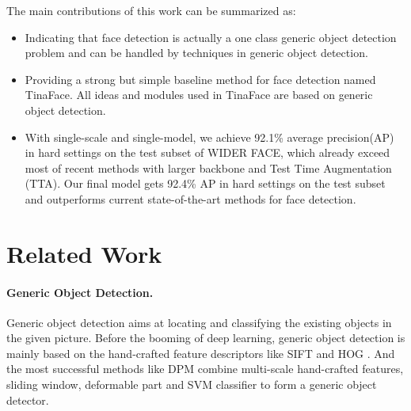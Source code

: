 \documentclass[final]{cvpr}
\begin{document}
The main contributions of this work can be summarized as:
\begin{itemize}
\item Indicating that face detection is actually a one class generic object detection problem and can be handled by techniques in generic object detection.
\item Providing a strong but simple baseline method for face detection named TinaFace. All ideas and modules used in TinaFace are based on generic object detection.
\item With single-scale and single-model, we achieve 92.1\% average precision(AP) in hard settings on the test subset of WIDER FACE, which already exceed most of recent methods with larger backbone and Test Time Augmentation (TTA). Our final model gets 92.4\% AP in hard settings on the test subset and outperforms current state-of-the-art methods for face detection.
\end{itemize}

\section{Related Work}

\paragraph{Generic Object Detection.}
Generic object detection aims at locating and classifying the existing objects in the given picture. Before the booming of deep learning, generic object detection is mainly based on the hand-crafted feature descriptors like SIFT \cite{lowe2004distinctive} and HOG \cite{dalal2005histograms}. And the most successful methods like DPM \cite{felzenszwalb2008discriminatively} combine multi-scale hand-crafted features, sliding window, deformable part and SVM classifier to form a generic object detector.
\end{document}
